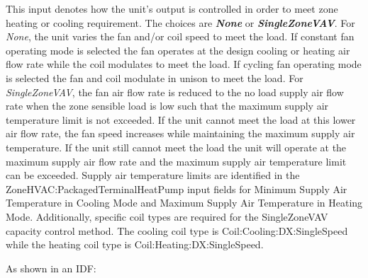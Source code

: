 This input denotes how the unit's output is controlled in order to meet zone heating or cooling requirement. The choices are \textbf{\emph{None}} or \textbf{\emph{SingleZoneVAV}}. For \emph{None}, the unit varies the fan and/or coil speed to meet the load. If constant fan operating mode is selected the fan operates at the design cooling or heating air flow rate while the coil modulates to meet the load. If cycling fan operating mode is selected the fan and coil modulate in unison to meet the load. For \emph{SingleZoneVAV}, the fan air flow rate is reduced to the no load supply air flow rate when the zone sensible load is low such that the maximum supply air temperature limit is not exceeded. If the unit cannot meet the load at this lower air flow rate, the fan speed increases while maintaining the maximum supply air temperature. If the unit still cannot meet the load the unit will operate at the maximum supply air flow rate and the maximum supply air temperature limit can be exceeded. Supply air temperature limits are identified in the ZoneHVAC:PackagedTerminalHeatPump input fields for Minimum Supply Air Temperature in Cooling Mode and Maximum Supply Air Temperature in Heating Mode. Additionally, specific coil types are required for the SingleZoneVAV capacity control method. The cooling coil type is Coil:Cooling:DX:SingleSpeed while the heating coil type is Coil:Heating:DX:SingleSpeed.

As shown in an IDF:

